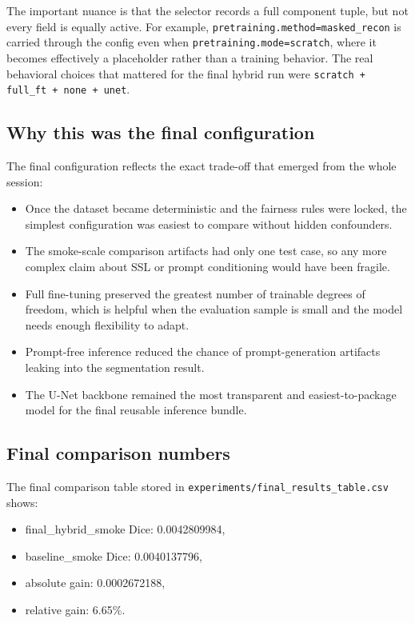 \documentclass[11pt,a4paper]{article}
\begin{document}
The important nuance is that the selector records a full component tuple, but not every field is equally active. For example, \texttt{pretraining.method=masked\_recon} is carried through the config even when \texttt{pretraining.mode=scratch}, where it becomes effectively a placeholder rather than a training behavior. The real behavioral choices that mattered for the final hybrid run were \texttt{scratch + full\_ft + none + unet}.

\subsection{Why this was the final configuration}
The final configuration reflects the exact trade-off that emerged from the whole session:
\begin{itemize}[leftmargin=1.5em]
    \item Once the dataset became deterministic and the fairness rules were locked, the simplest configuration was easiest to compare without hidden confounders.
    \item The smoke-scale comparison artifacts had only one test case, so any more complex claim about SSL or prompt conditioning would have been fragile.
    \item Full fine-tuning preserved the greatest number of trainable degrees of freedom, which is helpful when the evaluation sample is small and the model needs enough flexibility to adapt.
    \item Prompt-free inference reduced the chance of prompt-generation artifacts leaking into the segmentation result.
    \item The U-Net backbone remained the most transparent and easiest-to-package model for the final reusable inference bundle.
\end{itemize}

\subsection{Final comparison numbers}
The final comparison table stored in \texttt{experiments/final\_results\_table.csv} shows:
\begin{itemize}[leftmargin=1.5em]
    \item final\_hybrid\_smoke Dice: 0.0042809984,
    \item baseline\_smoke Dice: 0.0040137796,
    \item absolute gain: 0.0002672188,
    \item relative gain: 6.65\%.
\end{itemize}
\end{document}

